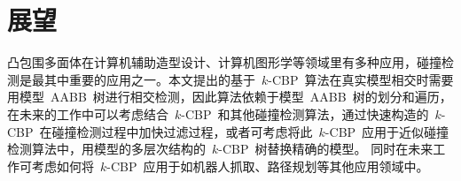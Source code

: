 \section{展望}
\label{sec:futurework}

凸包围多面体在计算机辅助造型设计、计算机图形学等领域里有多种应用，碰撞检测是最其中重要的应用之一。本文提出的基于~$k$-CBP~算法在真实模型相交时需要用模型~AABB~树进行相交检测，因此算法依赖于模型~AABB~树的划分和遍历，
在未来的工作中可以考虑结合~$k$-CBP~和其他碰撞检测算法，通过快速构造的~$k$-CBP~在碰撞检测过程中加快过滤过程，或者可考虑将此~$k$-CBP~应用于近似碰撞检测算法中，用模型的多层次结构的~$k$-CBP~树替换精确的模型。
同时在未来工作可考虑如何将~$k$-CBP~应用于如机器人抓取、路径规划等其他应用领域中。

